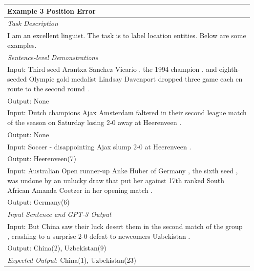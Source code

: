 \documentclass[11pt]{article}
\begin{document}
\begin{table}[th!]
{\begin{tabular}{l}
\textbf{Example 3 {\color{red} Position Error}} \\\midrule
       	\textit{Task Description} \\
I am an excellent linguist. The task is to label location entities. Below are some examples. \\\midrule
\textit{Sentence-level Demonstrations} \\
Input: Third seed Arantxa Sanchez Vicario , the 1994 champion , and eighth-seeded Olympic gold medalist Lindsay Davenport dropped three game each en route to the second round . \\
Output: None \\
Input: Dutch champions Ajax Amsterdam faltered in their second league match of the season on Saturday losing 2-0 away at Heerenveen . \\
Output: None \\
Input: Soccer - disappointing Ajax slump 2-0 at Heerenveen . \\
Output: Heerenveen(7) \\
Input: Australian Open runner-up Anke Huber of Germany , the sixth seed , was undone by an unlucky draw that put her against 17th ranked South African Amanda Coetzer in her opening match . \\
Output: Germany(6) \\\midrule
\textit{Input Sentence and GPT-3 Output} \\
Input: But China saw their luck desert them in the second match of the group , crashing to a surprise 2-0 defeat to newcomers Uzbekistan . \\
Output: China(2), Uzbekistan(9) \\
{\color{blue}\it Expected Output}: China(1), Uzbekistan(23) \\\bottomrule


\end{tabular}}
\end{table}
\end{document}
